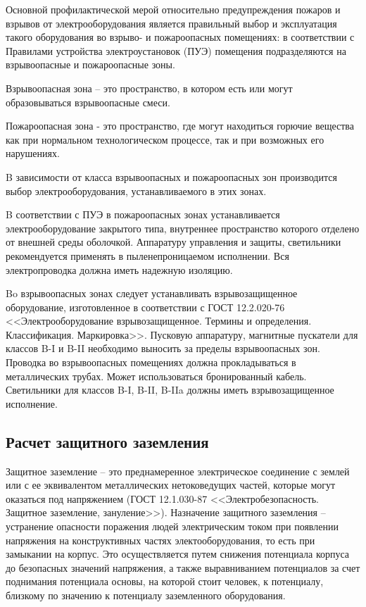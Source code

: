         Основной профилактической мерой относительно предупреждения пожаров и
        взрывов от электрооборудования является правильный выбор и эксплуатация
        такого оборудования во взрыво- и пожароопасных помещениях: в
        соответствии с Правилами устройства электроустановок (ПУЭ) помещения
        подразделяются на взрывоопасные и пожароопасные  зоны.

        Взрывоопасная зона – это пространство, в котором есть или могут
        образовываться взрывоопасные смеси.

        Пожароопасная зона - это пространство, где могут находиться горючие
        вещества как при нормальном технологическом процессе, так и при
        возможных его нарушениях.

        B зависимости от класса взрывоопасных и пожароопасных зон производится
        выбор электрооборудования, устанавливаемого в этих зонах.

        B соответствии с ПУЭ в пожароопасных зонах устанавливается
        электрооборудование закрытого типа, внутреннее пространство которого
        отделено от внешней среды оболочкой. Аппаратуру управления и защиты,
        светильники рекомендуется применять в пыленепроницаемом исполнении. Вся
        электропроводка должна иметь надежную изоляцию.

        Bo взрывоопасных зонах следует устанавливать взрывозащищенное
        оборудование, изготовленное в соответствии с ГОСТ 12.2.020-76
        <<Электрооборудование взрывозащищенное. Термины и определения.
        Классификация. Маркировка>>. Пусковую аппаратуру, магнитные пускатели
        для классов B-I и B-II необходимо выносить за пределы взрывоопасных
        зон. Проводка во взрывоопасных помещениях должна прокладываться в
        металлических трубах. Может использоваться бронированный кабель.
        Светильники для классов B-I, B-II, B-IIa должны иметь взрывозащищенное
        исполнение.

        \subsection{Расчет защитного заземления}

        Защитное заземление – это преднамеренное электрическое соединение с
        землей или с ее эквивалентом металлических нетоковедущих частей,
        которые могут оказаться под напряжением (ГОСТ 12.1.030-87
        <<Электробезопасность.  Защитное заземление, зануление>>).  Назначение
        защитного заземления -- устранение опасности поражения людей
        электрическим током при появлении напряжения на конструктивных частях
        электооборудования, то есть при замыкании на корпус. Это осуществляется
        путем снижения потенциала корпуса до безопасных значений напряжения, а
        также выравниванием потенциалов за счет поднимания потенциала основы,
        на которой стоит человек, к потенциалу, близкому по значению к
        потенциалу заземленного оборудования.

